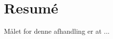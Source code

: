 \chapter{Resumé}
\begin{otherlanguage}{danish}

Målet for denne afhandling er at ...

\end{otherlanguage}
